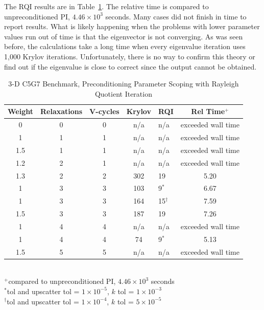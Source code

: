 \documentclass[preprint,12pt]{elsarticle}
\begin{document}
The RQI results are in Table~\ref{table:3-D c5g7 rqi}. The relative time is compared to unpreconditioned PI, $4.46 \times 10^{3}$ seconds. Many cases did not finish in time to report results. What is likely happening when the problems with lower parameter values run out of time is that the eigenvector is not converging. As was seen before, the calculations take a long time when every eigenvalue iteration uses 1,000 Krylov iterations. Unfortunately, there is no way to confirm this theory or find out if the eigenvalue is close to correct since the output cannot be obtained. 
%
\begin{table}[!h]
\caption{3-D C5G7 Benchmark, Preconditioning Parameter Scoping with Rayleigh Quotient Iteration}
\begin{center}
\begin{tabular}{| c | c | c | c | l | c |}
\hline
Weight & Relaxations & V-cycles & Krylov & RQI & Rel Time$^{+}$ \\[0.5ex]
\hline
0    & 0 & 0 & n/a     & n/a          & exceeded wall time \\
1    & 1 & 1 & n/a     & n/a          & exceeded wall time \\
1.5 & 1 & 1 & n/a     & n/a          & exceeded wall time \\
1.2 & 2 & 1 & n/a     & n/a          & exceeded wall time \\
1.3 & 2 & 2 & 302    & 19           & 5.20 \\ %
1    & 3 & 3 & 103    & 9$^{*}$    & 6.67 \\ %
1    & 3 & 3 & 164    & 15$^{\dag}$ & 7.59 \\ %
1.5 & 3 & 3 & 187    & 19           & 7.26 \\ %
1    & 4 & 4 & n/a     & n/a          & exceeded wall time \\
1    & 4 & 4 & 74     & 9$^{*}$    & 5.13 \\ %
1.5 & 5 & 5 & n/a     & n/a          & exceeded wall time \\
\hline 
\end{tabular}\\
$^{+}$compared to unpreconditioned PI, $4.46 \times 10^{3}$ seconds\\
$^{*}$tol and upscatter tol = $1 \times 10^{-5}$, $k$ tol = $1 \times 10^{-3}$\\
$^{\dag}$tol and upscatter tol = $1 \times 10^{-4}$, $k$ tol = $5 \times 10^{-5}$
\end{center}
\label{table:3-D c5g7 rqi}
\end{table}  
\end{document}
